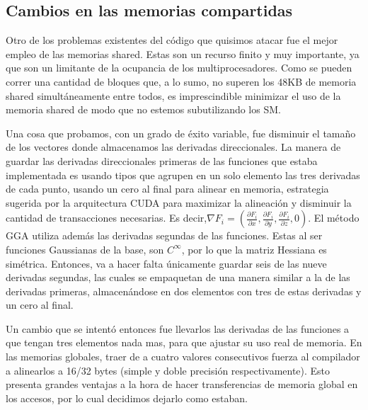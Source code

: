 \subsection{Cambios en las memorias compartidas}
Otro de los problemas existentes del c\'odigo que quisimos atacar fue el mejor empleo de las
memorias shared. Estas son un recurso finito y muy importante, ya que son un limitante de
la ocupancia de los multiprocesadores. Como se pueden correr una cantidad de bloques que, a lo sumo,
no superen los 48KB de memoria shared simult\'aneamente entre todos, es imprescindible minimizar
el uso de la memoria shared de modo que no estemos subutilizando los SM.

Una cosa que probamos, con un grado de \'exito variable, fue disminuir el tama\~no de los vectores
donde almacenamos las derivadas direccionales. La manera de guardar las derivadas direccionales primeras
de las funciones que estaba implementada es usando tipos que agrupen en un solo elemento las tres derivadas
de cada punto, usando un cero al final para alinear en memoria, estrategia sugerida por la arquitectura CUDA para
maximizar la alineaci\'on y disminuir la cantidad de transacciones necesarias.
Es decir,$\nabla F_i = ( \frac{\partial F_i}{\partial x},\frac{\partial F_i}{\partial y}, \frac{\partial F_i}{\partial z}, 0 )$.
El m\'etodo GGA utiliza adem\'as las derivadas segundas de las funciones. Estas al ser funciones
Gaussianas de la base, son $C^\infty$, por lo que la matriz Hessiana es sim\'etrica. Entonces, va
a hacer falta \'unicamente guardar seis de las nueve derivadas segundas, las cuales se empaquetan de una manera
similar a la de las derivadas primeras, almacen\'andose en dos elementos con tres de estas derivadas
y un cero al final.

Un cambio que se intent\'o entonces fue llevarlos las derivadas de las funciones a que tengan tres elementos nada mas, para que ajustar
su uso real de memoria.  En las memorias globales, traer de a cuatro  valores consecutivos fuerza
al compilador a alinearlos a 16/32 bytes (simple y doble precisi\'on respectivamente). Esto presenta
grandes ventajas a la hora de hacer transferencias de memoria global en los accesos, por lo cual
decidimos dejarlo como estaban.


